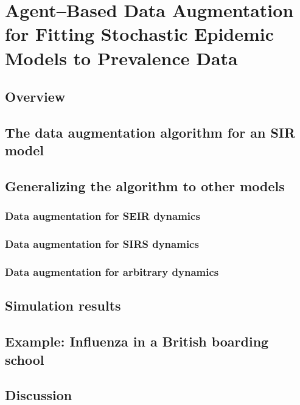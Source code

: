 \chapter{Agent--Based Data Augmentation for Fitting Stochastic Epidemic Models to Prevalence Data}
\label{chap:bda_for_fitting_sems_to_prevalence_data}

\section{Overview}
\label{sec:bda_overview}

\section{The data augmentation algorithm for an SIR model}
\label{sec:bda_sir_model}

\section{Generalizing the algorithm to other models}
\label{sec:bda_gen}

\subsection{Data augmentation for SEIR dynamics}
\label{subsec:bda_seir_model}

\subsection{Data augmentation for SIRS dynamics}
\label{subsec:bda_sirs_model}

\subsection{Data augmentation for arbitrary dynamics}
\label{subsec:bda_arbitrary_model}

\section{Simulation results}
\label{sec:bda_simulations}

\section{Example: Influenza in a British boarding school}
\label{sec:bda_bbs}

\section{Discussion}
\label{sec:bda_discussion}